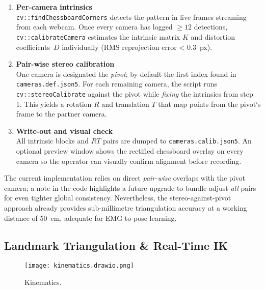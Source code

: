 \begin{enumerate}[label=\arabic*.]
  \item \textbf{Per-camera intrinsics}\\
        \verb|cv::findChessboardCorners| detects the pattern in live frames
        streaming from each webcam. Once every camera has logged
        $\ge12$ detections, \verb|cv::calibrateCamera| estimates the intrinsic
        matrix $K$ and distortion coefficients~$D$ individually
        (RMS reprojection error < \SI{0.3}{px}).

  \item \textbf{Pair-wise stereo calibration}\\
        One camera is designated the \emph{pivot}; by default the first index
        found in \texttt{cameras.def.json5}. For each remaining camera, the
        script runs \verb|cv::stereoCalibrate| against the pivot while
        \emph{fixing} the intrinsics from step 1.
        This yields a rotation $R$ and translation $T$ that map points from the
        pivot`s frame to the partner camera.

  \item \textbf{Write-out and visual check}\\
        All intrinsic blocks and $R\!T$ pairs are dumped to
        \texttt{cameras.calib.json5}. An optional preview window shows the
        rectified chessboard overlay on every camera so the operator can
        visually confirm alignment before recording.
\end{enumerate}

\noindent
The current implementation relies on direct \emph{pair-wise} overlaps with the
pivot camera; a note in the code highlights a future upgrade to bundle-adjust
\emph{all} pairs for even tighter global consistency. Nevertheless, the
stereo-against-pivot approach already provides sub-millimetre triangulation
accuracy at a working distance of \SI{50}{\centi\metre}, adequate for EMG-to-pose
learning.

\subsection{Landmark Triangulation \& Real-Time IK}

\begin{figure}[H]
    \centering
    \texttt{[image: kinematics.drawio.png]}
    \caption{Kinematics.}
    \label{fig:kinematics}
\end{figure}

